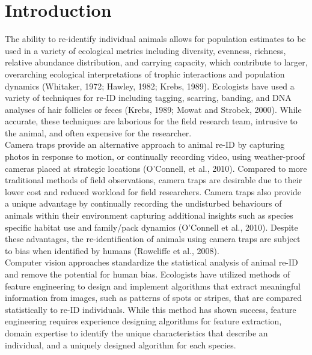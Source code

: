 \documentclass[11pt]{article}
\begin{document}
\section*{Introduction}

The ability to re-identify individual animals allows for population estimates to be used in a variety of ecological metrics including diversity, evenness, richness, relative abundance distribution, and carrying capacity, which contribute to larger, overarching ecological interpretations of trophic interactions and population dynamics (Whitaker, 1972; Hawley, 1982; Krebs, 1989). Ecologists have used a variety of techniques for re-ID including tagging, scarring, banding, and DNA analyses of hair follicles or feces (Krebs, 1989; Mowat and Strobek, 2000). While accurate, these techniques are laborious for the field research team, intrusive to the animal, and often expensive for the researcher.
\newline
\\
Camera traps provide an alternative approach to animal re-ID by capturing photos in response to motion, or continually recording video, using weather-proof cameras placed at strategic locations (O'Connell, et al., 2010). Compared to more traditional methods of field observations, camera traps are desirable due to their lower cost and reduced workload for field researchers. Camera traps also provide a unique advantage by continually recording the undisturbed behaviours of animals within their environment capturing additional insights such as species specific habitat use and family/pack dynamics (O'Connell et al., 2010). Despite these advantages, the re-identification of animals using camera traps are subject to bias when identified by humans (Rowcliffe et al., 2008).
\newline
\\
Computer vision approaches standardize the statistical analysis of animal re-ID and remove the potential for human bias. Ecologists have utilized methods of feature engineering to design and implement algorithms that extract meaningful information from images, such as patterns of spots or stripes, that are compared statistically to re-ID individuals. While this method has shown success, feature engineering requires experience designing algorithms for feature extraction, domain expertise to identify the unique characteristics that describe an individual, and a uniquely designed algorithm for each species.
\newline
\\
\end{document}
